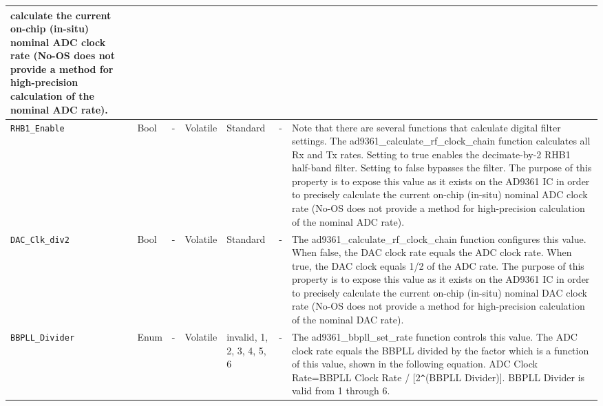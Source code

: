 \documentclass{article}
\begin{document}
\begin{landscape}
\begin{scriptsize}
\begin{longtable}{|p{3.6cm}|p{8.1cm}|p{1.4cm}|p{1.3cm}|p{1.4cm}|p{2.5cm}|p{3.6cm}|}
                                 calculate the current on-chip (in-situ) nominal
                                 ADC clock rate (No-OS does not provide a method
                                 for high-precision calculation of the nominal
                                 ADC rate). \\
			\hline
			\verb+RHB1_Enable+ & Bool & - & Volatile & Standard & - &
                               Note that there are several
                                 functions that calculate digital filter
                                 settings. The ad9361\_calculate\_rf\_clock\_chain
                                 function calculates all Rx and Tx rates.
                                 Setting to true enables the decimate-by-2
                                 RHB1 half-band filter. Setting to false
                                 bypasses the filter. The purpose of this
                                 property is to expose this value as it exists
                                 on the AD9361 IC in order to precisely
                                 calculate the current on-chip (in-situ) nominal
                                 ADC clock rate (No-OS does not provide a method
                                 for high-precision calculation of the nominal
                                 ADC rate). \\
			\hline
			\verb+DAC_Clk_div2+ & Bool & - & Volatile & Standard & - &
                                The ad9361\_calculate\_rf\_clock\_chain
                                  function configures this value. When false,
                                  the DAC clock rate equals the ADC clock rate.
                                  When true, the DAC clock equals 1/2 of the ADC
                                  rate. The purpose of this property is to
                                  expose this value as it exists on the AD9361
                                  IC in order to precisely calculate the current
                                  on-chip (in-situ) nominal DAC clock rate
                                  (No-OS does not provide a method for
                                  high-precision calculation of the nominal DAC
                                  rate). \\
			\hline
			\verb+BBPLL_Divider+ & Enum & - & Volatile & invalid, 1, 2, 3, 4, 5, 6 & - & The ad9361\_bbpll\_set\_rate function controls this value. The ADC clock rate equals the BBPLL divided by the factor which is a function of this value, shown in the following equation. ADC Clock Rate=BBPLL Clock Rate / [2\texttt{\^}(BBPLL Divider)]. BBPLL Divider is valid from 1 through 6. \\

\end{longtable}
\end{scriptsize}
\end{landscape}
\end{document}
